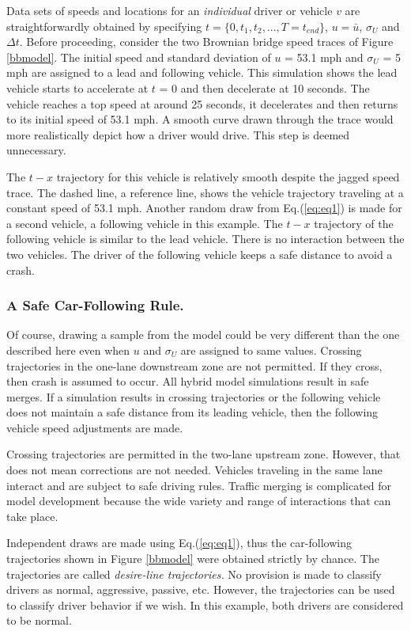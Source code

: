 \documentclass[Proceedings]{ascelike}
\begin{document}
Data sets of speeds and locations for an \emph{individual} driver or vehicle $v$ are straightforwardly obtained by specifying $t = \{0,t_1,t_2,\ldots,T = t_{end}\}$, $u = \bar{u}$, $\sigma_U$ and $\Delta t$. Before proceeding, consider the two Brownian bridge speed traces of Figure \ref{bbmodel}.  The initial speed  and standard deviation  of $u$ = 53.1 mph and $\sigma_U$ = 5 mph are assigned to a lead and following vehicle. This simulation shows the lead vehicle starts to accelerate at $t$ = 0 and then decelerate at 10 seconds. The vehicle reaches a top speed at around 25 seconds, it decelerates and then returns to its initial speed of 53.1 mph.  A smooth curve drawn through the trace would more realistically depict how a driver would drive. This step is deemed unnecessary.

The $t-x$ trajectory for this vehicle is relatively smooth despite the jagged  speed trace. The dashed line, a reference line, shows the vehicle trajectory  traveling at a constant speed of 53.1 mph. Another random draw from Eq.(\ref{eq:eq1}) is made for a second vehicle,  a following vehicle in this example. The $t-x$ trajectory of the following vehicle is similar to the lead vehicle. There is no interaction between the two vehicles. The driver of the following vehicle keeps a safe distance  to avoid a crash. 

\subsubsection{A Safe Car-Following Rule.} 

Of course, drawing a sample from the model could  be very different than the one described here even when $u$ and  $\sigma_U$  are assigned to same values. Crossing trajectories in the one-lane  downstream zone are not permitted. If they cross, then crash is assumed to occur. All hybrid model simulations result in safe merges. If a simulation results in crossing trajectories or the following vehicle does not maintain a safe distance from its leading vehicle, then the following vehicle speed adjustments are made. 

Crossing trajectories are permitted in the two-lane upstream zone. However, that does not mean corrections are not needed.  Vehicles traveling in the same lane interact and are subject to safe driving rules. Traffic merging is complicated for model development because the wide variety and range of interactions that can take place.

Independent draws are made using Eq.(\ref{eq:eq1}), thus the car-following trajectories shown in Figure \ref{bbmodel} were obtained strictly by chance. The trajectories are called \emph{desire-line trajectories.} No provision is made to classify drivers as normal, aggressive, passive,  etc. However, the trajectories can be used to classify driver behavior if we wish. In this example, both  drivers are considered  to be normal.
\end{document}
